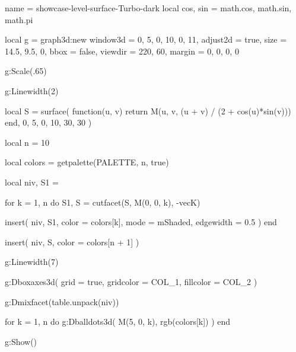 \documentclass[theme = dark]{tutodoc}
\newcommand{\PALETTE}{Turbo}
\begin{document}
\begin{luadraw}{name = showcase-level-surface-\PALETTE-dark}
local cos, sin = math.cos, math.sin, math.pi

local g = graph3d:new{
  window3d = {0, 5, 0, 10, 0, 11},
  adjust2d = true,
  size     = {14.5, 9.5, 0},
  bbox     = false,
  viewdir  = {220, 60},
  margin   = {0, 0, 0, 0}
}

g:Scale(.65)

g:Linewidth(2)

local S = surface(
  function(u, v)
    return M(u, v, (u + v) / (2 + cos(u)*sin(v)))
  end,
  0, 5, 0, 10,
  {30, 30}
)

local n = 10

local colors = getpalette(PALETTE, n, true)

local niv, S1 = {}

for k = 1, n do
  S1, S = cutfacet(S, {M(0, 0, k), -vecK})

  insert(
    niv,
    {
      S1,
      {
        color     = colors[k],
        mode      = mShaded,
        edgewidth = 0.5
      }
    }
  )
end

insert(
  niv,
  {
    S,
    {color = colors[n + 1]}
  }
)

g:Linewidth(7)

g:Dboxaxes3d({
  grid      = true,
  gridcolor = COL_1,
  fillcolor = COL_2
})

g:Dmixfacet(table.unpack(niv))

for k = 1, n do
  g:Dballdots3d(
    M(5, 0, k),
    rgb(colors[k])
  )
end

g:Show()
\end{luadraw}



\newpage
\end{document}
